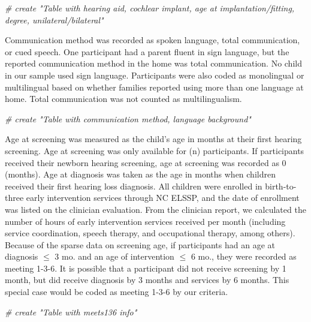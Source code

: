 \documentclass[
]{article}
\newenvironment{Shaded}{\begin{snugshade}}{\end{snugshade}}
\newcommand{\CommentTok}[1]{\textcolor[rgb]{0.56,0.35,0.01}{\textit{#1}}}
\begin{document}
\begin{Shaded}
\begin{Highlighting}[]
\CommentTok{# create "Table with hearing aid, cochlear implant, age at implantation/fitting, degree, unilateral/bilateral"}
\end{Highlighting}
\end{Shaded}

Communication method was recorded as spoken language, total
communication, or cued speech. One participant had a parent fluent in
sign language, but the reported communication method in the home was
total communication. No child in our sample used sign language.
Participants were also coded as monolingual or multilingual based on
whether families reported using more than one language at home. Total
communication was not counted as multilingualism.

\begin{Shaded}
\begin{Highlighting}[]
\CommentTok{# create "Table with communication method, language background"}
\end{Highlighting}
\end{Shaded}

Age at screening was measured as the child's age in months at their
first hearing screening. Age at screening was only available for (n)
participants. If participants received their newborn hearing screening,
age at screening was recorded as 0 (months). Age at diagnosis was taken
as the age in months when children received their first hearing loss
diagnosis. All children were enrolled in birth-to-three early
intervention services through NC ELSSP, and the date of enrollment was
listed on the clinician evaluation. From the clinician report, we
calculated the number of hours of early intervention services received
per month (including service coordination, speech therapy, and
occupational therapy, among others). Because of the sparse data on
screening age, if participants had an age at diagnosis \(\leq\) 3 mo.
and an age of intervention \(\leq\) 6 mo., they were recorded as meeting
1-3-6. It is possible that a participant did not receive screening by 1
month, but did receive diagnosis by 3 months and services by 6 months.
This special case would be coded as meeting 1-3-6 by our criteria.

\begin{Shaded}
\begin{Highlighting}[]
\CommentTok{# create "Table with meets136 info"}
\end{Highlighting}
\end{Shaded}
\end{document}
